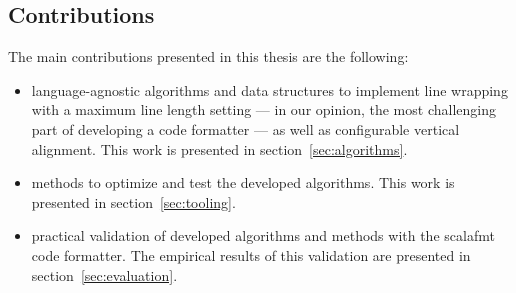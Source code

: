 \subsection{Contributions}
The main contributions presented in this thesis are the following:
\begin{itemize}
  \item language-agnostic algorithms and data structures to implement line
    wrapping with a maximum line length setting --- in our opinion, the most
    challenging part of developing a code formatter --- as well as configurable
    vertical alignment.
    This work is presented in section~\ref{sec:algorithms}.
  \item methods to optimize and test the developed algorithms.
    This work is presented in section~\ref{sec:tooling}.
  \item practical validation of developed algorithms and methods with the scalafmt code formatter.
    The empirical results of this validation are presented in section~\ref{sec:evaluation}.
\end{itemize}
